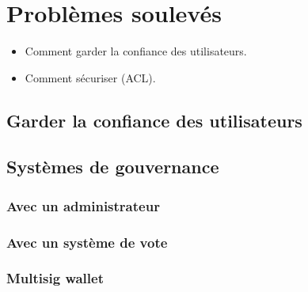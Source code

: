 \section{Problèmes soulevés}

\begin{itemize}
    \item Comment garder la confiance des utilisateurs.
    \item Comment sécuriser (ACL).
\end{itemize}


\subsection{Garder la confiance des utilisateurs}

\subsection{Systèmes de gouvernance}

\subsubsection{Avec un administrateur}

\subsubsection{Avec un système de vote}

\subsubsection{Multisig wallet}

